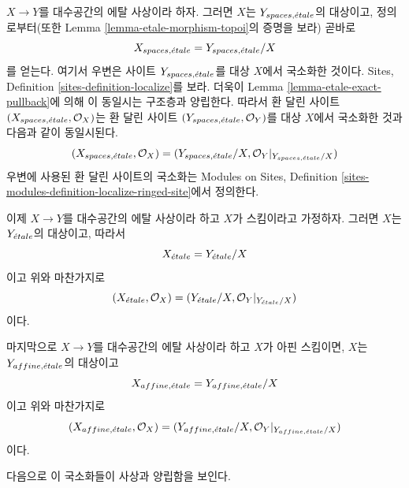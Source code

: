 \medskip\noindent
$X \to Y$를 대수공간의 에탈 사상이라 하자. 그러면 $X$는
$Y_{spaces, {\acute{e}tale}}$의 대상이고, 정의로부터(또한 Lemma
\ref{lemma-etale-morphism-topoi}의 증명을 보라) 곧바로
\begin{equation}
\label{equation-localize}
X_{spaces, {\acute{e}tale}} = Y_{spaces, {\acute{e}tale}}/X
\end{equation}
를 얻는다. 여기서 우변은 사이트 $Y_{spaces, {\acute{e}tale}}$를 대상 $X$에서
국소화한 것이다. Sites, Definition \ref{sites-definition-localize}를 보라.
더욱이 Lemma \ref{lemma-etale-exact-pullback}에 의해 이 동일시는
구조층과 양립한다. 따라서 환 달린 사이트
$(X_{spaces, {\acute{e}tale}}, \mathcal{O}_X)$는 환 달린 사이트
$(Y_{spaces, {\acute{e}tale}}, \mathcal{O}_Y)$를 대상 $X$에서 국소화한 것과
다음과 같이 동일시된다.
\begin{equation}
\label{equation-localize-ringed}
(X_{spaces, {\acute{e}tale}}, \mathcal{O}_X) =
(Y_{spaces, {\acute{e}tale}}/X, \mathcal{O}_Y|_{Y_{spaces, {\acute{e}tale}}/X})
\end{equation}
우변에 사용된 환 달린 사이트의 국소화는 Modules on Sites,
Definition \ref{sites-modules-definition-localize-ringed-site}에서 정의한다.

\medskip\noindent
이제 $X \to Y$를 대수공간의 에탈 사상이라 하고 $X$가 스킴이라고
가정하자. 그러면 $X$는 $Y_{\acute{e}tale}$의 대상이고, 따라서
\begin{equation}
\label{equation-localize-at-scheme}
X_{\acute{e}tale} = Y_{\acute{e}tale}/X
\end{equation}
이고 위와 마찬가지로
\begin{equation}
\label{equation-localize-at-scheme-ringed}
(X_{\acute{e}tale}, \mathcal{O}_X) =
(Y_{\acute{e}tale}/X, \mathcal{O}_Y|_{Y_{\acute{e}tale}/X})
\end{equation}
이다.

\medskip\noindent
마지막으로 $X \to Y$를 대수공간의 에탈 사상이라 하고 $X$가 아핀
스킴이면, $X$는 $Y_{affine, {\acute{e}tale}}$의 대상이고
\begin{equation}
\label{equation-localize-at-affine}
X_{affine, {\acute{e}tale}} = Y_{affine, {\acute{e}tale}}/X
\end{equation}
이고 위와 마찬가지로
\begin{equation}
\label{equation-localize-at-affine-ringed}
(X_{affine, {\acute{e}tale}}, \mathcal{O}_X) =
(Y_{affine, {\acute{e}tale}}/X, \mathcal{O}_Y|_{Y_{affine, {\acute{e}tale}}/X})
\end{equation}
이다.

\medskip\noindent
다음으로 이 국소화들이 사상과 양립함을 보인다.

